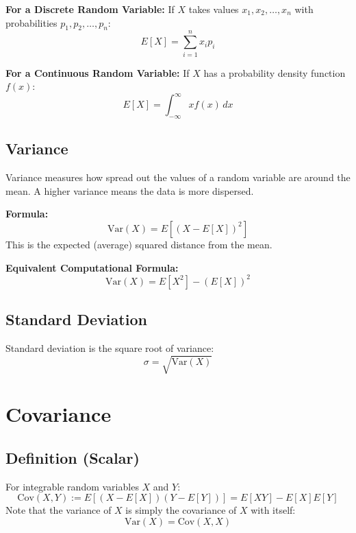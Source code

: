 \documentclass[12pt, a4paper]{report}
\begin{document}
\textbf{For a Discrete Random Variable:}
If $X$ takes values $x_1, x_2, \dots, x_n$ with probabilities $p_1, p_2, \dots, p_n$:
\begin{equation}
    E[X] = \sum_{i=1}^{n} x_i p_i
\end{equation}

\textbf{For a Continuous Random Variable:}
If $X$ has a probability density function $f(x)$:
\begin{equation}
    E[X] = \int_{-\infty}^{\infty} x f(x) \, dx
\end{equation}

\subsection{Variance}
Variance measures how spread out the values of a random variable are around the mean. A higher variance means the data is more dispersed.

\textbf{Formula:}
\begin{equation}
    \text{Var}(X) = E[(X - E[X])^2]
\end{equation}
This is the expected (average) squared distance from the mean.

\textbf{Equivalent Computational Formula:}
\begin{equation}
    \text{Var}(X) = E[X^2] - (E[X])^2
\end{equation}

\subsection{Standard Deviation}
Standard deviation is the square root of variance:
\begin{equation}
    \sigma = \sqrt{\text{Var}(X)}
\end{equation}

\section{Covariance}

\subsection{Definition (Scalar)}
For integrable random variables $X$ and $Y$:
\begin{equation}
    \text{Cov}(X,Y) := E[(X - E[X])(Y - E[Y])] = E[XY] - E[X]E[Y]
\end{equation}
Note that the variance of $X$ is simply the covariance of $X$ with itself:
\[ \text{Var}(X) = \text{Cov}(X, X) \]
\end{document}
